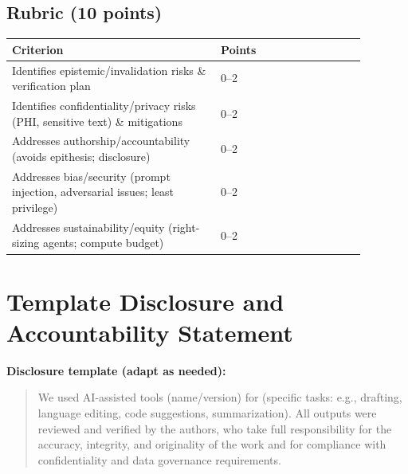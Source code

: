 \documentclass[11pt]{article}
\begin{document}
\subsection{Rubric (10 points)}
\begin{center}
\begin{tabular}{@{}p{0.52\linewidth}p{0.36\linewidth}@{}}
\toprule
\textbf{Criterion} & \textbf{Points} \\
\midrule
Identifies epistemic/invalidation risks \& verification plan & 0--2 \\
Identifies confidentiality/privacy risks (PHI, sensitive text) \& mitigations & 0--2 \\
Addresses authorship/accountability (avoids epithesis; disclosure) & 0--2 \\
Addresses bias/security (prompt injection, adversarial issues; least privilege) & 0--2 \\
Addresses sustainability/equity (right-sizing agents; compute budget) & 0--2 \\
\bottomrule
\end{tabular}
\end{center}

\appendix
\section{Template Disclosure and Accountability Statement}
\label{app:disclosure}
\noindent\textbf{Disclosure template (adapt as needed):}
\begin{quote}
We used AI-assisted tools (name/version) for (specific tasks: e.g., drafting, language editing, code suggestions, summarization). All outputs were reviewed and verified by the authors, who take full responsibility for the accuracy, integrity, and originality of the work and for compliance with confidentiality and data governance requirements.
\end{quote}
\end{document}
